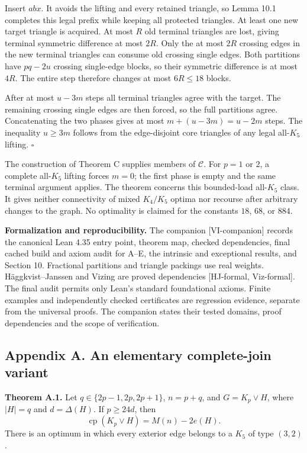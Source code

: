 \documentclass[english,11pt,a4paper]{article}
\begin{document}
Insert \(abx\). It avoids the lifting and every retained triangle, so
Lemma 10.1 completes this legal prefix while keeping all protected
triangles. At least one new target triangle is acquired. At most \(R\)
old terminal triangles are lost, giving terminal symmetric difference at
most \(2R\). Only the at most \(2R\) crossing edges in the new terminal
triangles can consume old crossing single edges. Both partitions have
\(pq-2u\) crossing single-edge blocks, so their symmetric difference is
at most \(4R\). The entire step therefore changes at most \(6R\le18\)
blocks.

After at most \(u-3m\) steps all terminal triangles agree with the
target. The remaining crossing single edges are then forced, so the full
partitions agree. Concatenating the two phases gives at most
\(m+(u-3m)=u-2m\) steps. The inequality \(u\ge3m\) follows from the
edge-disjoint core triangles of any legal all-\(K_5\) lifting.
\(\square\)

The construction of Theorem C supplies members of \(\mathcal C\). For
\(p=1\) or \(2\), a complete all-\(K_5\) lifting forces \(m=0\); the
first phase is empty and the same terminal argument applies. The theorem
concerns this bounded-load all-\(K_5\) class. It gives neither
connectivity of mixed \(K_4/K_5\) optima nor recourse after arbitrary
changes to the graph. No optimality is claimed for the constants \(18\),
\(68\), or \(884\).

\textbf{Formalization and reproducibility.} The companion
{[}VI-companion{]} records the canonical Lean 4.35 entry point, theorem
map, checked dependencies, final cached build and axiom audit for A--E,
the intrinsic and exceptional results, and Section 10. Fractional
partitions and triangle packings use real weights. Häggkvist--Janssen
and Vizing are proved dependencies {[}HJ-formal, Viz-formal{]}. The
final audit permits only Lean's standard foundational axioms. Finite
examples and independently checked certificates are regression evidence,
separate from the universal proofs. The companion states their tested
domains, proof dependencies and the scope of verification.

\subsection{Appendix A. An elementary complete-join
variant}\label{appendix-a.-an-elementary-complete-join-variant}

\textbf{Theorem A.1.} Let \(q\in\{2p-1,2p,2p+1\}\), \(n=p+q\), and
\(G=K_p\vee H\), where \(|H|=q\) and \(d=\Delta(H)\). If \(p\ge24d\),
then \[
\operatorname{cp}(K_p\vee H)=M(n)-2e(H). \tag{23}
\] There is an optimum in which every exterior edge belongs to a \(K_5\)
of type \((3,2)\).
\end{document}
